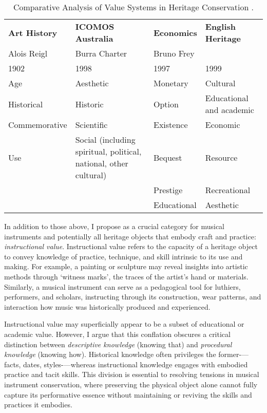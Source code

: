 \begin{table}[h]
    \centering
    \begin{adjustbox}{width=\textwidth}
        \begin{tabular}{llll}
            \toprule
            \textbf{Art History} & \textbf{ICOMOS Australia} & \textbf{Economics} & \textbf{English Heritage} \\
            Alois Reigl & Burra Charter & Bruno Frey &  \\ 
            1902 & 1998 & 1997 & 1999 \\ \hline
            Age & Aesthetic & Monetary & Cultural \\ 
            Historical & Historic & Option & Educational and academic \\ 
            Commemorative & Scientific & Existence & Economic \\ 
            Use & Social (including spiritual, political, national, other cultural) & Bequest & Resource \\ 
            & & Prestige & Recreational \\
            & & Educational & Aesthetic \\
            \bottomrule
        \end{tabular}
    \end{adjustbox}
    \caption{Comparative Analysis of Value Systems in Heritage Conservation \cite{avrami_values_2000}.}
    \label{tab:values_comparison}
\end{table}

In addition to those above, I propose as a crucial category for musical instruments and potentially all heritage objects that embody craft and practice: \emph{instructional value}. Instructional value refers to the capacity of a heritage object to convey knowledge of practice, technique, and skill intrinsic to its use and making. For example, a painting or sculpture may reveal insights into artistic methods through `witness marks', the traces of the artist’s hand or materials. Similarly, a musical instrument can serve as a pedagogical tool for luthiers, performers, and scholars, instructing through its construction, wear patterns, and interaction how music was historically produced and experienced.

Instructional value may superficially appear to be a subset of educational or academic value. However, I argue that this conflation obscures a critical distinction between \emph{descriptive knowledge} (knowing that) and \emph{procedural knowledge} (knowing how). Historical knowledge often privileges the former-—facts, dates, styles-—whereas instructional knowledge engages with embodied practice and tacit skills. This division is essential to resolving tensions in musical instrument conservation, where preserving the physical object alone cannot fully capture its performative essence without maintaining or reviving the skills and practices it embodies.

